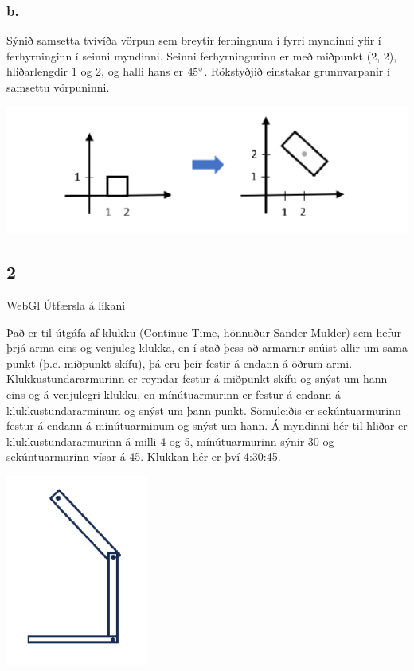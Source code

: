 \documentclass{article}
\begin{document}
\subsubsection{b.} Sýnið samsetta tvívíða vörpun sem breytir ferningnum í fyrri myndinni yfir í
ferhyrninginn í seinni myndinni. Seinni ferhyrningurinn er með miðpunkt (2,
2), hliðarlengdir 1 og 2, og halli hans er $45\degree$. Rökstyðjið einstakar
grunnvarpanir í samsettu vörpuninni.

\includegraphics[scale = 0.9]{myndir/mynd2023b.png}

\newpage

\subsection{2} WebGl Útfærsla á líkani

Það er til útgáfa af klukku (Continue Time, hönnuður Sander Mulder) sem hefur
þrjá arma eins og venjuleg klukka, en í stað þess að armarnir
snúist allir um sama punkt (þ.e. miðpunkt skífu), þá eru þeir
festir á endann á öðrum armi. Klukkustundararmurinn er
reyndar festur á miðpunkt skífu og snýst um hann eins og á
venjulegri klukku, en mínútuarmurinn er festur á endann á
klukkustundararminum og snýst um þann punkt. Sömuleiðis
er sekúntuarmurinn festur á endann á mínútuarminum og
snýst um hann. Á myndinni hér til hliðar er
klukkustundararmurinn á milli 4 og 5, mínútuarmurinn sýnir
30 og sekúntuarmurinn vísar á 45. Klukkan hér er því
4:30:45.

\includegraphics[scale = 0.9]{myndir/klukka.png}
\end{document}
